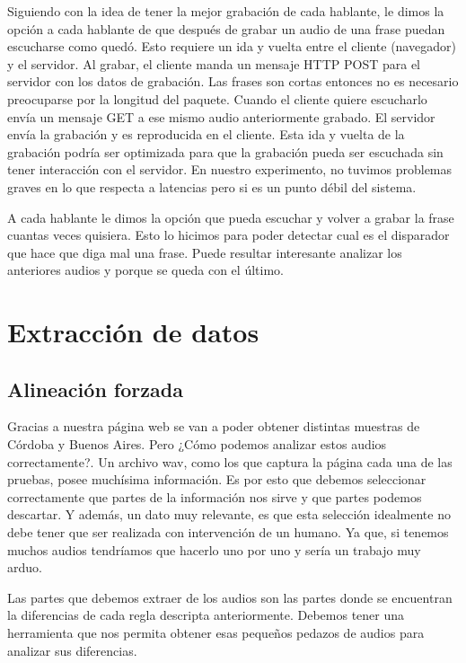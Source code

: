 \documentclass[11pt,a4paper,twoside]{tesis}
\begin{document}
Siguiendo con la idea de tener la mejor grabación de cada hablante, le dimos la opción a cada hablante de que después de grabar un audio de una frase puedan escucharse como quedó. Esto requiere un ida y vuelta entre el cliente (navegador) y el servidor. Al grabar, el cliente manda un mensaje HTTP POST para el servidor con los datos de grabación. Las frases son cortas entonces no es necesario preocuparse por la longitud del paquete. Cuando el cliente quiere escucharlo envía un mensaje GET a ese mismo audio anteriormente grabado. El servidor envía la grabación y es reproducida en el cliente. Esta ida y vuelta de la grabación podría ser optimizada para que la grabación pueda ser escuchada sin tener interacción con el servidor. En nuestro experimento, no tuvimos problemas graves en lo que respecta a latencias pero si es un punto débil del sistema.

A cada hablante le dimos la opción que pueda escuchar y volver a grabar la frase cuantas veces quisiera. Esto lo hicimos para poder detectar cual es el disparador que hace que diga mal una frase. Puede resultar interesante analizar los anteriores audios y porque se queda con el último.

\chapter{Extracción de datos}

\section{Alineación forzada}

Gracias a nuestra página web se van a poder obtener distintas muestras de Córdoba y Buenos Aires. Pero ¿Cómo podemos analizar estos audios correctamente?. Un archivo wav, como los que captura la página cada una de las pruebas, posee muchísima información. Es por esto que debemos seleccionar correctamente que partes de la información nos sirve y que partes podemos descartar. Y además, un dato muy relevante, es que esta selección idealmente no debe tener que ser realizada con intervención de un humano. Ya que, si tenemos muchos audios tendríamos que hacerlo uno por uno y sería un trabajo muy arduo.

Las partes que debemos extraer de los audios son las partes donde se encuentran la diferencias de cada regla descripta anteriormente. Debemos tener una herramienta que nos permita obtener esas pequeños pedazos de audios para analizar sus diferencias. 
\end{document}
